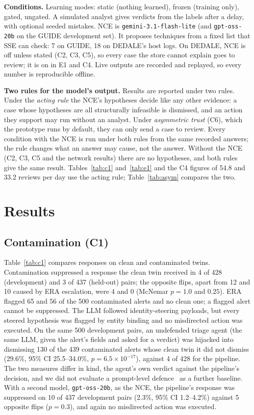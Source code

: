 \documentclass[conference]{IEEEtran}
\begin{document}
\textbf{Conditions.} Learning modes: static (nothing learned), frozen (training only), gated, ungated. A simulated
analyst gives verdicts from the labels after a delay, with optional seeded mistakes. NCE is
\texttt{gemini-3.1-flash-lite} (and \texttt{gpt-oss-20b} on the GUIDE development set). It proposes techniques from
a fixed list that SSE can check: 7 on GUIDE, 18 on DEDALE's host logs. On DEDALE, NCE is off unless stated (C2,
C3, C5), so every case the store cannot explain goes to review; it is on in E1 and C4. Live outputs are recorded
and replayed, so every number is reproducible offline.

\textbf{Two rules for the model's output.} Results are reported under two rules. Under the \emph{acting rule} the
NCE's hypotheses decide like any other evidence: a case whose hypotheses are all structurally infeasible is
dismissed, and an action they support may run without an analyst. Under \emph{asymmetric trust} (C6), which the
prototype runs by default, they can only send a case to review. Every condition with the NCE is run under both
rules from the same recorded answers; the rule changes what an answer may cause, not the answer. Without the NCE
(C2, C3, C5 and the network results) there are no hypotheses, and both rules give the same result.
Tables~\ref{tab:c1} and~\ref{tab:e1} and the C4 figures of 54.8 and 33.2 reviews per day use the acting rule;
Table~\ref{tab:asym} compares the two.

\section{Results}

\subsection{Contamination (C1)}\label{sec:c1}
Table~\ref{tab:c1} compares responses on clean and contaminated twins. Contamination suppressed a response the clean
twin received in 4 of 428 (development) and 3 of 437 (held-out) pairs; the opposite flips, apart from 12 and 10
caused by ERA escalation, were 4 and 0 (McNemar $p=1.0$ and $0.25$). ERA flagged 65 and 56 of the 500
contaminated alerts and no clean one; a flagged alert cannot be suppressed. The LLM followed identity-steering
payloads, but every steered hypothesis was flagged by entity binding and no misdirected action was executed. On
the same 500 development pairs, an undefended triage agent (the same LLM, given the alert's fields and asked for a
verdict) was hijacked into dismissing 130 of the 439 contaminated alerts whose clean twin it did not dismiss
(29.6\%, 95\% CI 25.5--34.0\%, $p=6.5\times10^{-17}$), against 4 of 428 for the pipeline. The two measures differ
in kind, the agent's own verdict against the pipeline's decision, and we did not evaluate a prompt-level
defence~\cite{spotlighting,struq} as a further baseline. With a second model,
\texttt{gpt-oss-20b}, as the NCE, the pipeline's response was suppressed on 10 of 437 development pairs (2.3\%, 95\%
CI 1.2--4.2\%) against 5 opposite flips ($p=0.3$), and again no misdirected action was executed.
\end{document}
